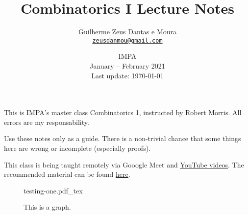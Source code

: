 \documentclass[a4paper, 10pt]{article}
\title{\sffamily \bfseries Combinatorics I Lecture Notes}
\author{\sc Guilherme Zeus Dantas e Moura\\\href{mailto:zeusdanmou@gmail.com}{\texttt{zeusdanmou@gmail.com}}}
\date{IMPA\\[3pt] January -- February 2021\\[3pt] Last update: \today}
\newcommand{\incfig}[2][1]{%
    \def\svgwidth{#1\columnwidth}
    {#2.pdf_tex}
}
\begin{document}
    \maketitle
	\sloppy
	
		This is IMPA's master class Combinatorics 1, instructed by Robert Morris.
		All errors are my responsability.

		Use these notes only as a guide. There is a non-trivial chance that some things here are wrong or incomplete (especially proofs).

		This class is being taught remotely via Gooogle Meet and \href{https://www.youtube.com/playlist?list=PLo4jXE-LdDTSkmHd3xNGhcObfWXvpwmCL}{YouTube videos}. The recommended material can be found \href{https://impa.br/wp-content/uploads/2017/04/28CBM_04.pdf}{here}.

		\hfill

		\begin{figure}[h]
			\centering
			\incfig[.8]{testing-one}
			\caption{This is a graph.}
			\label{fig:testing-one}
		\end{figure}

		\hfill

	\newpage
	\tableofcontents

	\newpage
    
    
    
    
    
\end{document}
